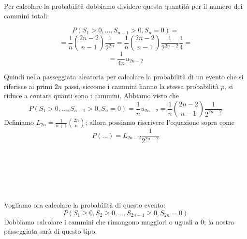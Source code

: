 \documentclass[a4paper,12pt]{book}
\begin{document}
Per calcolare la probabilità dobbiamo dividere questa quantità per il numero dei cammini totali:

$$ P(S_1 > 0, ..., S_{n-1} > 0, S_n = 0) = $$
$$ = \frac{1}{n} \binom{2n-2}{n-1} \frac{1}{2^{2n}} = \frac{1}{n}\binom{2n-2}{n-1}\frac{1}{2^{2n-2}}\frac{1}{4} = $$
$$ = \frac{1}{4n} u_{2n-2} $$

Quindi nella passeggiata aleatoria per calcolare la probabilità di un evento che si riferisce ai primi $ 2n $ passi, siccome i cammini hanno la stessa probabilità $ p $,
 si riduce a contare quanti sono i cammini. Abbiamo visto che 
 $$ P (S_1 > 0, ..., S_{n-1} > 0, S_n = 0) = \frac{1}{n} u_{2n-2} = \frac{1}{n}\binom{2n-2}{n-1} \frac{1}{2^{2n-2}}$$
 Definiamo $ L_{2n} = \frac{1}{n+1}\binom{2n}{n} $; allora possiamo riscrivere l'equazione sopra come
 $$ P(...) = L_{2n-2} \frac{1}{2^{2n-2}} $$
\\
\\
\\
\\
\\
\\
Vogliamo ora calcolare la probabilità di questo evento:
$$ P(S_1 \ge 0, S_2 \ge 0, ..., S_{2n-1} \ge 0, S_{2n} = 0) $$
Dobbiamo calcolare i cammini che rimangono maggiori o uguali a 0; la nostra passeggiata sarà di questo tipo:

\begin{center}
\end{center}
\end{document}
